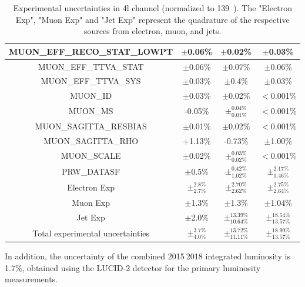 \begin{table}[H]
\begin{center}
\begin{tabular}{|c|c|c|c|}
\hline
MUON\_EFF\_RECO\_STAT\_LOWPT&$\pm$0.06\%&$\pm$0.02\%&$\pm$0.03\%\\
\hline
MUON\_EFF\_TTVA\_STAT&$\pm$0.06\%&$\pm$0.07\%&$\pm$0.06\%\\
\hline
MUON\_EFF\_TTVA\_SYS&$\pm$0.03\%&$\pm$0.4\%&$\pm$0.03\%\\
\hline
MUON\_ID&$\pm$0.03\%&$\pm$0.02\%&$<$0.001\%\\
\hline
MUON\_MS&-0.05\%&$\pm^{0.04\%}_{0.01\%}$&$<$0.001\%\\
\hline
MUON\_SAGITTA\_RESBIAS&$\pm$0.01\%&$\pm$0.02\%&$<$0.001\%\\
\hline
MUON\_SAGITTA\_RHO&+1.13\%&-0.73\%&$\pm$1.00\%\\
\hline
MUON\_SCALE&$\pm$0.02\%&$\pm^{0.03\%}_{0.02\%}$&$<$0.001\%\\
\hline
PRW\_DATASF&$\pm$0.5\%&$\pm^{0.42\%}_{1.02\%}$&$\pm^{2.17\%}_{1.46\%}$\\
\hline
\hline
Electron Exp&$\pm^{2.8\%}_{2.7\%}$&$\pm^{2.70\%}_{2.62\%}$&$\pm^{2.75\%}_{2.64\%}$\\
\hline
Muon Exp&$\pm$1.3\%&$\pm$1.3\%&$\pm$1.04\%\\
\hline
Jet Exp&$\pm$2.0\%&$\pm^{13.39\%}_{10.64\%}$&$\pm^{18.54\%}_{13.57\%}$\\
\hline
\hline
Total experimental uncertainties &$\pm^{3.7\%}_{4.0\%}$&$\pm^{13.72\%}_{11.11\%}$&$\pm^{18.90\%}_{13.57\%}$\\
\hline
\end{tabular}
\caption{
Experimental uncertainties in 4l channel (normalized to 139~\ifb).
The "Electron Exp", "Muon Exp" and "Jet Exp" represent the quadrature of the respective sources from electron, muon, and jets.
}
\label{tab:syst_exp_num}
\end{center}
\end{table}

In addition, the uncertainty of the combined 2015$~$2018 integrated luminosity is 1.7\%\cite{ATLAS-CONF-2019-021},
obtained using the LUCID-2 detector\cite{Avoni_2018} for the primary luminosity measurements.

